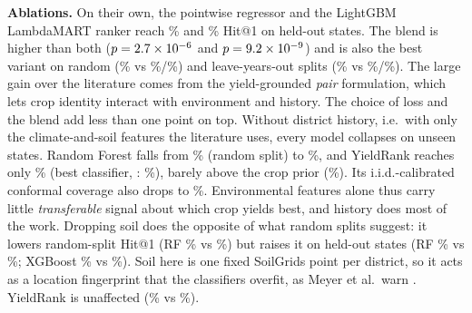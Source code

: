 \documentclass[conference]{IEEEtran}
\begin{document}
\textbf{Ablations.} On their own, the pointwise regressor and the LightGBM LambdaMART ranker
reach \PointHitLSO\% and \ListHitLSO\% Hit@1 on held-out states. The blend is higher than both
($p=2.7\times10^{-6}$ and $p=9.2\times10^{-9}$) and is also the best variant on random (\OursHitR\% vs
\PointHitR\%/\ListHitR\%) and leave-years-out splits (\OursHitLYO\% vs \PointHitLYO\%/\ListHitLYO\%).
The large gain over the literature comes from the yield-grounded \emph{pair} formulation, which
lets crop identity interact with environment and history. The choice of loss and the blend add
less than one point on top. Without district history, i.e.\ with only the climate-and-soil
features the literature uses, every model collapses on unseen states. Random Forest falls from
\NHRFHitR\% (random split) to \NHRFHitLSO\%, and YieldRank reaches only \NHOursHitLSO\% (best
classifier, \NHBaseNameLSO: \NHBaseHitLSO\%), barely above the crop prior
(\NHPriorHitLSO\%). Its i.i.d.-calibrated conformal coverage also drops to \NHCovIIDLSO\%.
Environmental features alone thus carry little \emph{transferable} signal about which crop
yields best, and history does most of the work. Dropping soil does the opposite of what
random splits suggest: it lowers random-split Hit@1 (RF \NSRFHitR\% vs \RFHitR\%) but raises
it on held-out states (RF \NSRFHitLSO\% vs \RFHitLSO\%; XGBoost \NSXGBHitLSO\% vs
\XGBHitLSO\%). Soil here is one fixed SoilGrids point per district, so it acts as a
location fingerprint that the classifiers overfit, as Meyer et al.\ warn \cite{meyer2019}.
YieldRank is unaffected (\NSOursHitLSO\% vs \OursHitLSO\%).

\begin{table}[t]
\caption{YieldRank on held-out states: 90\% LAC sets under different calibration schemes
(coverage, mean set size, number of states with $\ge$30 test queries that fall below 85\%
coverage, and worst state coverage).}
\label{tab:conflso}
\centering\scriptsize
\resizebox{\columnwidth}{!}{}
\end{table}
\end{document}
